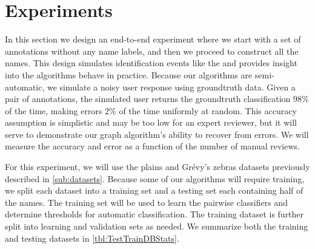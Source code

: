 


\section{Experiments}\label{sec:graphexpt}

    In this section we design an end-to-end experiment where we start with a set of annotations without any name
      labels, and then we proceed to construct all the names.
    This design simulates identification events like the \GZC{} and provides insight into the algorithms behave
      in practice.
    Because our algorithms are semi-automatic, we simulate a noisy user response using groundtruth data.
    Given a pair of annotations, the simulated user returns the groundtruth classification $98\percent$ of the
      time, making errors $2\percent$ of the time uniformly at random.
    This accuracy assumption is simplistic and may be too low for an expert reviewer, but it will serve to
      demonstrate our graph algorithm's ability to recover from errors.
    We will measure the accuracy and error as a function of the number of manual reviews.

    For this experiment, we will use the plains and Grévy's zebras datasets previously described in
      \cref{sub:datasets}.
    Because some of our algorithms will require training, we split each dataset into a training set and a testing
      set each containing half of the names.
    The training set will be used to learn the pairwise classifiers and determine thresholds for automatic
      classification.
    The training dataset is further split into learning and validation sets as needed.
    We summarize both the training and testing datasets in \cref{tbl:TestTrainDBStats}.

    \TestTrainDBStats{}

